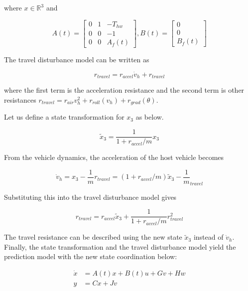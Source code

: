 \documentclass[12pt]{report}
\begin{document}
where \(x \in \mathbb{R}^3\) and

\[
A(t) = 
\begin{bmatrix}
0 & 1 & -T_{hw} \\
0 & 0 & -1 \\
0 & 0 & A_f(t)
\end{bmatrix}, 
B(t) = 
\begin{bmatrix}
0 \\
0 \\
B_f(t)
\end{bmatrix}
\]

The travel disturbance model can be written as

\begin{equation}
r_{travel} = r_{accel} \dot{v}_h + r_{travel}
\end{equation}

where the first term is the acceleration resistance and the second term is other resistances \(r_{travel} = r_{air} v_h^2 + r_{roll}(v_h) + r_{grad}(\theta)\).

Let us define a state transformation for \(x_3\) as below.

\begin{equation}
\tilde{x}_3 = \frac{1}{1 + r_{accel}/m} x_3
\end{equation}

From the vehicle dynamics, the acceleration of the host vehicle becomes

\begin{equation}
\dot{v}_h = x_3 - \frac{1}{m} r_{travel} = (1 + r_{accel}/m) \tilde{x}_3 - \frac{1}{m}
_{travel}
\end{equation}

Substituting this into the travel disturbance model gives

\begin{equation}
r_{travel} = r_{accel} \tilde{x}_3 + \frac{1}{1 + r_{accel}/m} r_{travel}^2
\end{equation}

The travel resistance can be described using the new state \(\tilde{x}_3\) instead of \(\dot{v}_h\). Finally, the state transformation and the travel disturbance model yield the prediction model with the new state coordination below:

\begin{equation}
\begin{aligned}
\dot{x} &= A(t)x + B(t)u + Gv + Hw \\
y &= Cx + Jv
\end{aligned}
\end{equation}
\end{document}
